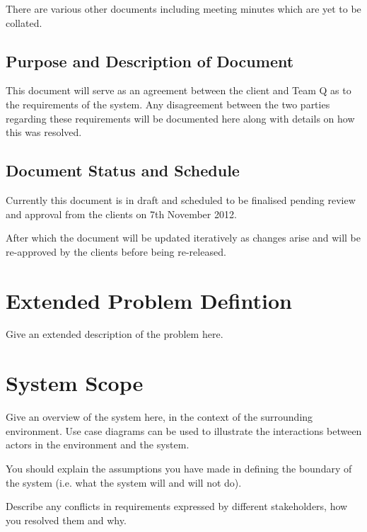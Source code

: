 \documentclass{l3deliverable}
\begin{document}
There are various other documents including meeting minutes which are yet to
be collated.

\subsection{Purpose and Description of Document}

This document will serve as an agreement between the client and Team
Q as to the requirements of the system. Any disagreement between the
two parties regarding these requirements will be documented here along
with details on how this was resolved.

\subsection{Document Status and Schedule}

Currently this document is in draft and scheduled to be finalised
pending review and approval from the clients on 7th November 2012.

After which the document will be updated iteratively as changes
arise and will be re-approved by the clients before being re-released.

\section{Extended Problem Defintion}


Give an extended description of the problem here.


\section{System Scope} %

Give an overview of the system here, in the context of the surrounding
environment.  Use case diagrams can be used to illustrate the
interactions between actors in the environment and the system.

You should explain the assumptions you have made in defining the
boundary of the system (i.e. what the system will and will not do).

Describe any conflicts in requirements expressed by different
stakeholders, how you resolved them and why.
\end{document}
